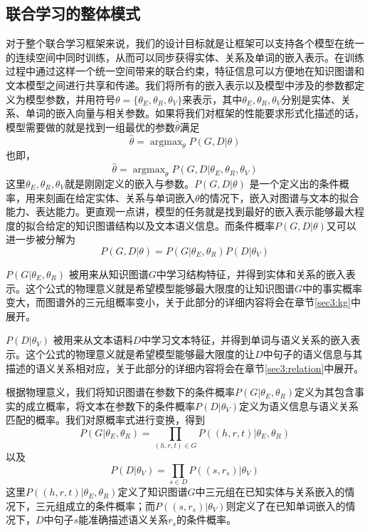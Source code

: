 \subsection{联合学习的整体模式}
\label{sec3:joint}

对于整个联合学习框架来说，我们的设计目标就是让框架可以支持各个模型在统一的连续空间中同时训练，从而可以同步获得实体、关系及单词的嵌入表示。在训练过程中通过这样一个统一空间带来的联合约束，特征信息可以方便地在知识图谱和文本模型之间进行共享和传递。我们将所有的嵌入表示以及模型中涉及的参数都定义为模型参数，并用符号$\theta = \{\theta_E, \theta_R, \theta_V\}$来表示，其中$\theta_E, \theta_R, \theta_V$分别是实体、关系、单词的嵌入向量与相关参数。如果将我们对框架的性能要求形式化描述的话，模型需要做的就是找到一组最优的参数$\hat{\theta}$满足
\begin{equation}
\hat{\theta} = \mathop{\arg\max}_{\theta} P(G, D | {\theta}) 
\end{equation}
也即，
\begin{equation}
\hat{\theta} = \mathop{\arg\max}_{\theta} P(G, D | {\theta_E, \theta_R, \theta_V})
\end{equation}
这里$\theta_E, \theta_R, \theta_V$就是刚刚定义的嵌入与参数。$P(G, D | {\theta})$ 是一个定义出的条件概率，用来刻画在给定实体、关系与单词嵌入$\theta$的情况下，嵌入对图谱与文本的拟合能力、表达能力。更直观一点讲，模型的任务就是找到最好的嵌入表示能够最大程度的拟合给定的知识图谱结构以及文本语义信息。而条件概率$P(G, D | {\theta})$又可以进一步被分解为
\begin{equation}
\label{eq3:topeq}
P(G,D|{\theta}) = P(G|{\theta_E,\theta_R})P(D|{\theta_V})
\end{equation}

$P(G|\theta_E, \theta_R)$ 被用来从知识图谱$G$中学习结构特征，并得到实体和关系的嵌入表示。这个公式的物理意义就是希望模型能够最大限度的让知识图谱$G$中的事实概率变大，而图谱外的三元组概率变小，关于此部分的详细内容将会在章节\ref{sec3:kg}中展开。

$P(D|{\theta_V})$ 被用来从文本语料$D$中学习文本特征，并得到单词与语义关系的嵌入表示。这个公式的物理意义就是希望模型能够最大限度的让$D$中句子的语义信息与其描述的语义关系相对应，关于此部分的详细内容将会在章节\ref{sec3:relation}中展开。

根据物理意义，我们将知识图谱在参数下的条件概率$P(G|\theta_E, \theta_R)$定义为其包含事实的成立概率，将文本在参数下的条件概率$P(D|{\theta_V})$定义为语义信息与语义关系匹配的概率。我们对原概率式进行变换，得到
\begin{equation}
P(G|{\theta_E,\theta_R})  = \prod_{(h,r,t) \in G}P((h, r, t)|{\theta_E, \theta_R})
\end{equation}
以及
\begin{equation}
P(D|{\theta_V})  = \prod_{s \in D}P((s, r_s)|{\theta_V})
\end{equation}
这里$P((h, r, t)|{\theta_E,\theta_R})$定义了知识图谱$G$中三元组在已知实体与关系嵌入的情况下，三元组成立的条件概率；而$P((s, r_s)|{\theta_V})$则定义了在已知单词嵌入的情况下，$D$中句子$s$能准确描述语义关系$r_s$的条件概率。

